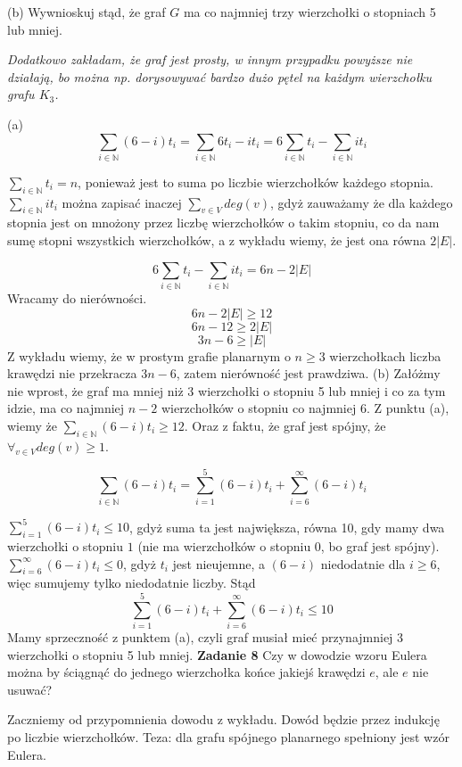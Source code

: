 \documentclass[12pt,a4paper]{article}
\begin{document}
(b) Wywnioskuj stąd, że graf \(G\) ma co najmniej trzy wierzchołki o stopniach 5 lub mniej.

\textit{Dodatkowo zakładam, że graf jest prosty, w innym przypadku powyższe nie działają, bo można np. dorysowywać bardzo dużo pętel na każdym wierzchołku grafu \(K_3\).}
\vskip 1cm

(a) 
\[
	\sum_{i \in \mathbb{N}} (6- i)t_i = \sum_{i \in \mathbb{N}} 6t_i- it_i 
	= 6\sum_{i \in \mathbb{N}}t_i - \sum_{i \in \mathbb{N}} it_i
\]

\( \sum_{i \in \mathbb{N}}t_i = n \), ponieważ jest to suma po liczbie wierzchołków każdego stopnia. \( \sum_{i \in \mathbb{N}} it_i \) można zapisać inaczej \( \sum_{v \in V} deg(v) \), gdyż zauważamy że dla każdego stopnia jest on mnożony przez liczbę wierzchołków o takim stopniu, co da nam sumę stopni wszystkich wierzchołków, a z wykładu wiemy, że jest ona równa \( 2|E| \).

\[
	6\sum_{i \in \mathbb{N}}t_i - \sum_{i \in \mathbb{N}} it_i = 6n - 2|E|
\]
Wracamy do nierówności.
\[
	6n - 2|E| \geq 12
\]
\[
	6n - 12 \geq 2|E|
\]
\[
	3n - 6 \geq |E|
\]
Z wykładu wiemy, że w prostym grafie planarnym o \(n \geq 3\) wierzchołkach liczba krawędzi nie przekracza \(3n - 6\), zatem nierówność jest prawdziwa.
\vskip 0.2cm
(b) Załóżmy nie wprost, że graf ma mniej niż 3 wierzchołki o stopniu 5 lub mniej i co za tym idzie,  ma co najmniej \(n-2\) wierzchołków o stopniu co najmniej 6. Z punktu (a), wiemy że \( \sum_{i \in \mathbb{N}} (6- i)t_i \geq 12 \). Oraz z faktu, że graf jest spójny, że \(\forall_{v \in V} deg(v) \geq 1\).

\[
	\sum_{i \in \mathbb{N}} (6- i)t_i = \sum_{i = 1}^5 (6- i)t_i + \sum_{i = 6}^\infty (6- i)t_i
\]

\( \sum_{i = 1}^5 (6- i)t_i \leq 10 \), gdyż suma ta jest największa, równa 10, gdy mamy dwa wierzchołki o stopniu \(1\) (nie ma wierzchołków o stopniu 0, bo graf jest spójny). \( \sum_{i = 6}^\infty (6- i)t_i \leq 0 \), gdyż \(t_i\) jest nieujemne, a \( (6 - i) \) niedodatnie dla \( i \geq 6 \), więc sumujemy tylko niedodatnie liczby. Stąd
\[
	\sum_{i = 1}^5 (6- i)t_i + \sum_{i = 6}^\infty (6- i)t_i \leq 10
\]
Mamy sprzeczność z punktem (a), czyli graf musiał mieć przynajmniej 3 wierzchołki o stopniu 5 lub mniej.
\vskip 1cm
\noindent
\textbf{Zadanie 8} Czy w dowodzie wzoru Eulera można by ściągnąć do jednego wierzchołka końce jakiejś krawędzi \(e\), ale \(e\) nie usuwać?
\vskip 0.2cm

Zaczniemy od przypomnienia dowodu z wykładu. Dowód będzie przez indukcję po liczbie wierzchołków. Teza: dla grafu spójnego planarnego spełniony jest wzór Eulera.
\end{document}
